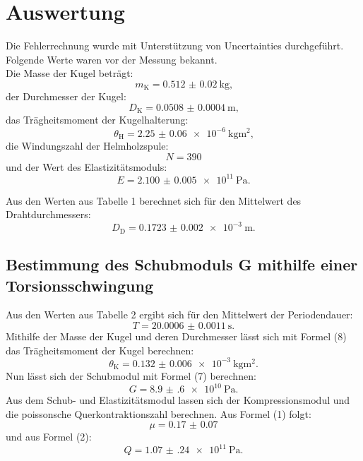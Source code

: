 
\section{Auswertung}
\label{sec:Auswertung}
Die Fehlerrechnung wurde mit Unterstützung von Uncertainties \cite{uncertainties} durchgeführt.
Folgende Werte waren vor der Messung bekannt.\\
Die Masse der Kugel beträgt:
\begin{displaymath}
	m_\text{K} = \SI{0.512(20)}{\kilogram}\text{,}
\end{displaymath}
der Durchmesser der Kugel:
\begin{displaymath}
	D_\text{K} = \SI{0.0508(4)}{\meter}\text{,}
\end{displaymath}
das Trägheitsmoment der Kugelhalterung:  
\begin{displaymath}
	\theta_\text{H} = \SI{2.25(6)e-6}{\kilogram\meter\squared}\text{,}
\end{displaymath}
die Windungszahl der Helmholzspule:
\begin{displaymath}
	N = \num{390}
\end{displaymath}
und der Wert des Elastizitätsmoduls:  
\begin{displaymath}
	E = \SI{2.100(5)e11}{\pascal}\text{.}
\end{displaymath}

Aus den Werten aus Tabelle 1 berechnet sich für den Mittelwert des Drahtdurchmessers:
\begin{displaymath}
D_\text{D} = \SI{0.1723(20)e-3}{\meter}\text{.}
\end{displaymath}




\subsection{Bestimmung des Schubmoduls G mithilfe einer Torsionsschwingung}

Aus den Werten aus Tabelle 2 ergibt sich für den Mittelwert der Periodendauer:
\begin{displaymath}
	T = \SI{20.0006(11)}{\second}\text{.}
\end{displaymath}
Mithilfe der Masse der Kugel und deren Durchmesser lässt sich mit Formel (8) das Trägheitsmoment der Kugel berechnen:
\begin{displaymath}
	\theta_{\text{K}} = \SI{0.132(6)e-3}{\kilogram\meter\squared}\text{.}
\end{displaymath}
Nun lässt sich der Schubmodul mit Formel (7) berechnen:
\begin{displaymath}
	G = \SI{8.9(6)e10}{\pascal}\text{.}
\end{displaymath}
Aus dem Schub- und Elastizitätsmodul lassen sich der Kompressionsmodul und die poissonsche Querkontraktionszahl berechnen. Aus Formel (1) folgt:
\begin{displaymath}
	\mu = \num{0.17(7)}
\end{displaymath}
und aus Formel (2):
\begin{displaymath}
	Q = \SI{1.07(24)e11}{\pascal}\text{.}
\end{displaymath}








